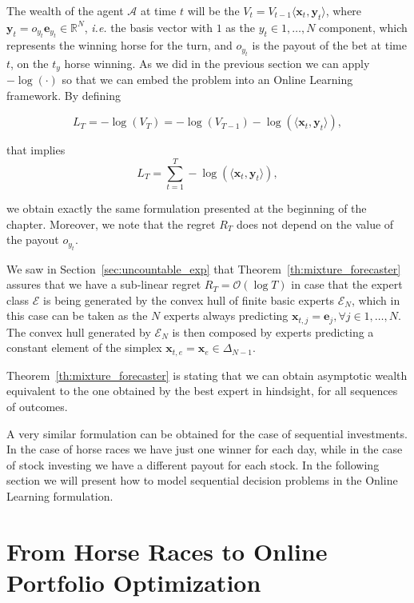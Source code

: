 The wealth of the agent $\mathcal A$ at time $t$ will be the $V_t=V_{t-1}\langle \mathbf x_t, \mathbf y_t \rangle$, where $\mathbf y_t=o_{y_t}\mathbf e_{y_t}\in\mathbb R^N$, \emph{i.e.} the basis vector with $1$ as the $y_t\in1,\ldots,N$ component, which represents the winning horse for the turn, and $o_{y_t}$ is the payout of the bet at time $t$, on the $t_y$ horse winning. As we did in the previous section we can apply $-\log(\cdot)$ so that we can embed the problem into an Online Learning framework. By defining 

$$L_T=-\log(V_T)=-\log(V_{T-1})-\log(\langle \mathbf x_t,\mathbf y_t\rangle),$$

that implies 
\begin{equation}\label{eq:log_loss_hr}
L_T=\sum\limits_{t=1}^T-\log(\langle \mathbf x_t,\mathbf y_t\rangle),
\end{equation}

we obtain exactly the same formulation presented at the beginning of the chapter. Moreover, we note that the regret $R_T$ does not 
depend on the value of the payout $o_{y_t}$. 

We saw in Section~\ref{sec:uncountable_exp} that Theorem~\ref{th:mixture_forecaster} assures that we have a sub-linear regret $R_T=\mathcal O(\log T)$ in case that the expert class $\mathcal E$ is being generated by the convex hull of finite basic experts $\mathcal E_N$, which in this case can be taken as the $N$ experts always predicting $\mathbf x_{t,j}=\mathbf e_j, \forall j\in 1,\ldots,N$. The convex hull generated by $\mathcal E_N$ is then composed by experts predicting a constant element of the simplex $\mathbf x_{t,e}=\mathbf x_e\in \Delta_{N-1}$. 

Theorem~\ref{th:mixture_forecaster} is stating that we can obtain asymptotic wealth equivalent to the one obtained by the best expert in hindsight, for all sequences of outcomes. 

A very similar formulation can be obtained for the case of sequential investments. In the case of horse races we have just one winner for each day, while in the case of stock investing we have a different payout for each stock. In the following section we will present how to model sequential decision problems in the Online Learning formulation.

\section{From Horse Races to Online Portfolio Optimization}\label{sec:from_horse_to_ptf}

